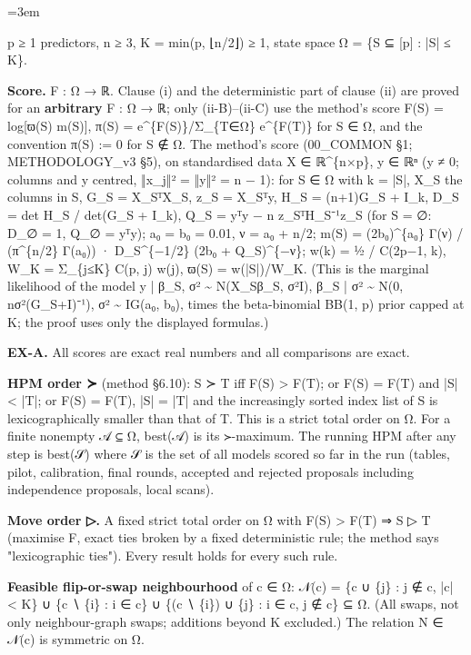 \documentclass[11pt]{report}
\newenvironment{mdblock}{\begingroup\mdfont\raggedright\setlength{\parindent}{0pt}\setlength{\parskip}{0.55em}\emergencystretch=3em}{\par\endgroup}
\begin{document}
\begin{mdblock}
\begin{mdbul}
\item p ≥ 1 predictors, n ≥ 3, K = min(p, ⌊n/2⌋) ≥ 1, state space Ω = \{S ⊆ [p] : |S| ≤ K\}.
\item \textbf{Score.} F : Ω → ℝ. Clause (i) and the deterministic part of clause (ii) are proved for an \textbf{arbitrary} F : Ω → ℝ; only (ii-B)–(ii-C) use the method's score F(S) = log[ϖ(S) m(S)], π(S) = e\textasciicircum{}\{F(S)\}/Σ\_\{T∈Ω\} e\textasciicircum{}\{F(T)\} for S ∈ Ω, and the convention π(S) := 0 for S ∉ Ω. The method's score (00\_COMMON §1; METHODOLOGY\_v3 §5), on standardised data X ∈ ℝ\textasciicircum{}\{n×p\}, y ∈ ℝⁿ (y ≠ 0; columns and y centred, ‖x\_j‖² = ‖y‖² = n − 1): for S ∈ Ω with k = |S|, X\_S the columns in S, G\_S = X\_SᵀX\_S, z\_S = X\_Sᵀy, H\_S = (n+1)G\_S + I\_k, D\_S = det H\_S / det(G\_S + I\_k), Q\_S = yᵀy − n z\_SᵀH\_S⁻¹z\_S (for S = ∅: D\_∅ = 1, Q\_∅ = yᵀy); a₀ = b₀ = 0.01, ν = a₀ + n/2; m(S) = (2b₀)\textasciicircum{}\{a₀\} Γ(ν) / (π\textasciicircum{}\{n/2\} Γ(a₀)) · D\_S\textasciicircum{}\{−1/2\} (2b₀ + Q\_S)\textasciicircum{}\{−ν\}; w(k) = ½ / C(2p−1, k), W\_K = Σ\_\{j≤K\} C(p, j) w(j), ϖ(S) = w(|S|)/W\_K. (This is the marginal likelihood of the model y | β\_S, σ² \textasciitilde{} N(X\_Sβ\_S, σ²I), β\_S | σ² \textasciitilde{} N(0, nσ²(G\_S+I)⁻¹), σ² \textasciitilde{} IG(a₀, b₀), times the beta-binomial BB(1, p) prior capped at K; the proof uses only the displayed formulas.)
\item \textbf{EX-A.} All scores are exact real numbers and all comparisons are exact.
\item \textbf{HPM order ≻} (method §6.10): S ≻ T iff F(S) > F(T); or F(S) = F(T) and |S| < |T|; or F(S) = F(T), |S| = |T| and the increasingly sorted index list of S is lexicographically smaller than that of T. This is a strict total order on Ω. For a finite nonempty 𝒜 ⊆ Ω, best(𝒜) is its ≻-maximum. The running HPM after any step is best(𝒮) where 𝒮 is the set of all models scored so far in the run (tables, pilot, calibration, final rounds, accepted and rejected proposals including independence proposals, local scans).
\item \textbf{Move order ▷.} A fixed strict total order on Ω with F(S) > F(T) ⇒ S ▷ T (maximise F, exact ties broken by a fixed deterministic rule; the method says "lexicographic ties"). Every result holds for every such rule.
\item \textbf{Feasible flip-or-swap neighbourhood} of c ∈ Ω: 𝒩(c) = \{c ∪ \{j\} : j ∉ c, |c| < K\} ∪ \{c ∖ \{i\} : i ∈ c\} ∪ \{(c ∖ \{i\}) ∪ \{j\} : i ∈ c, j ∉ c\} ⊆ Ω. (All swaps, not only neighbour-graph swaps; additions beyond K excluded.) The relation N ∈ 𝒩(c) is symmetric on Ω.
\end{mdbul}


\end{mdblock}
\end{document}
